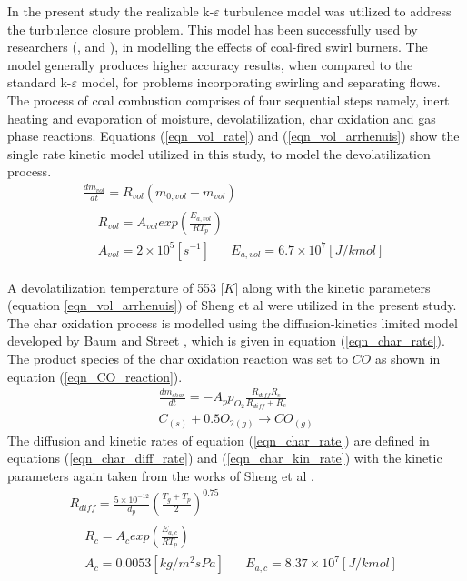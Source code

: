 \documentclass[review]{elsarticle}
\begin{document}
In the present study the realizable k-$\varepsilon$ turbulence model was utilized to address the turbulence closure problem. This model has been successfully used by researchers (\cite{Belosevic2019a},\cite{Laubscher2019a} and \cite{Modlinski2019}), in modelling the effects of coal-fired swirl burners. The model generally produces higher accuracy results, when compared to the standard k-$\varepsilon$ model, for problems incorporating swirling and separating flows.\\

The process of coal combustion comprises of four sequential steps namely, inert heating and evaporation of moisture, devolatilization, char oxidation and gas phase reactions. Equations (\ref{eqn_vol_rate}) and (\ref{eqn_vol_arrhenuis}) show the single rate kinetic model utilized in this study, to model the devolatilization process.
\begin{gather}
\frac{dm_{vol}}{dt} = R_{vol}(m_{0,vol}-m_{vol}) \label{eqn_vol_rate} \\
\begin{split}
&R_{vol} = A_{vol}exp\left(\frac{E_{a,vol}}{RT_p}\right)\\
&A_{vol} = 2\times10^5 [s^{-1}]\,\,\,\,\,\,\,\,\,\,E_{a,vol} = 6.7\times10^7 [J/kmol] \label{eqn_vol_arrhenuis}
\end{split}
\end{gather}

A devolatilization temperature of 553 [$K$] \citep{Ranade2015} along with the kinetic parameters (equation \ref{eqn_vol_arrhenuis}) of Sheng et al \cite{Sheng2004} were utilized in the present study.\\

The char oxidation process is modelled using the diffusion-kinetics limited model developed by Baum and Street \cite{Baum1971}, which is given in equation (\ref{eqn_char_rate}). The product species of the char oxidation reaction was set to $CO$ as shown in equation (\ref{eqn_CO_reaction}). 
\begin{gather}
\frac{dm_{char}}{dt} = -A_p p_{O_{2}} \frac{R_{diff}R_c}{R_{diff} + R_c}  \label{eqn_char_rate}\\
C_{(s)}+0.5O_{2(g)}\to CO_{(g)} \label{eqn_CO_reaction}
\end{gather}
The diffusion and kinetic rates of equation (\ref{eqn_char_rate}) are defined in equations (\ref{eqn_char_diff_rate})  and (\ref{eqn_char_kin_rate}) with the kinetic parameters again taken from the works of Sheng et al \citep{Sheng2004}.
\begin{gather}
R_{diff} = \frac{5\times10^{-12}}{d_p} \left(\frac{T_g+T_p}{2}\right)^{0.75} \label{eqn_char_diff_rate}\\
\begin{split}
&R_{c} = A_{c}exp\left(\frac{E_{a,c}}{RT_p}\right)\\
&A_{c} = 0.0053 [kg/m^2sPa]\,\,\,\,\,\,\,\,\,\,E_{a,c} = 8.37\times10^7 [J/kmol]
\end{split}
 \label{eqn_char_kin_rate}
\end{gather}
\end{document}
